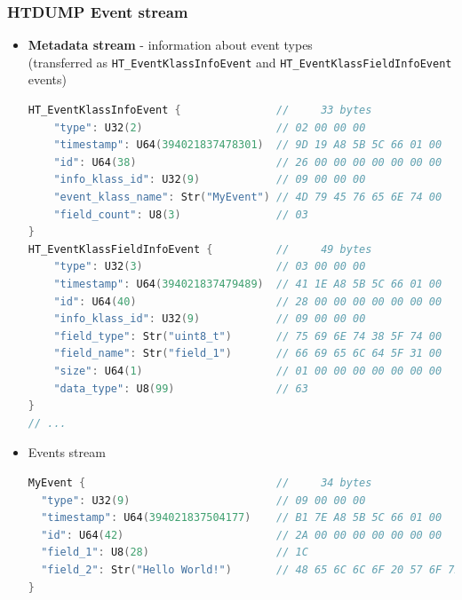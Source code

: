 \documentclass{beamer}
\begin{document}
\begin{frame}[fragile]
  \frametitle{HTDUMP Event stream}
  \fontsize{10pt}{7.2}\selectfont
  \begin{itemize}
    \item \textbf{Metadata stream} - information about event types \\
      {\tiny (transferred as \lstinline{HT_EventKlassInfoEvent} and \lstinline{HT_EventKlassFieldInfoEvent} events)}
      \begin{lstlisting}[language=C++,basicstyle=\tiny]
HT_EventKlassInfoEvent {               //     33 bytes
    "type": U32(2)                     // 02 00 00 00
    "timestamp": U64(394021837478301)  // 9D 19 A8 5B 5C 66 01 00
    "id": U64(38)                      // 26 00 00 00 00 00 00 00
    "info_klass_id": U32(9)            // 09 00 00 00
    "event_klass_name": Str("MyEvent") // 4D 79 45 76 65 6E 74 00
    "field_count": U8(3)               // 03
}
HT_EventKlassFieldInfoEvent {          //     49 bytes
    "type": U32(3)                     // 03 00 00 00
    "timestamp": U64(394021837479489)  // 41 1E A8 5B 5C 66 01 00
    "id": U64(40)                      // 28 00 00 00 00 00 00 00
    "info_klass_id": U32(9)            // 09 00 00 00
    "field_type": Str("uint8_t")       // 75 69 6E 74 38 5F 74 00
    "field_name": Str("field_1")       // 66 69 65 6C 64 5F 31 00
    "size": U64(1)                     // 01 00 00 00 00 00 00 00
    "data_type": U8(99)                // 63
}
// ...
      \end{lstlisting}

  \item Events stream
    \begin{lstlisting}[language=C++,basicstyle=\tiny]
MyEvent {                              //     34 bytes
  "type": U32(9)                       // 09 00 00 00
  "timestamp": U64(394021837504177)    // B1 7E A8 5B 5C 66 01 00
  "id": U64(42)                        // 2A 00 00 00 00 00 00 00
  "field_1": U8(28)                    // 1C
  "field_2": Str("Hello World!")       // 48 65 6C 6C 6F 20 57 6F 72 6C 64 21 00
}
    \end{lstlisting}
  \end{itemize}
\end{frame}

\end{document}
